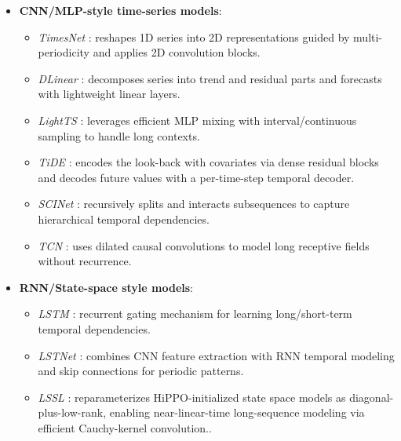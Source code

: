 \begin{itemize}[leftmargin=*, itemsep=2pt]
\item \textbf{CNN/MLP-style time-series models}:
\begin{itemize}[leftmargin=*, itemsep=1pt]
\item \textit{TimesNet} \citep{wu2023timesnet}: reshapes 1D series into 2D representations guided by multi-periodicity and applies 2D convolution blocks.
\item \textit{DLinear} \citep{zeng2023dlinear}: decomposes series into trend and residual parts and forecasts with lightweight linear layers.
\item \textit{LightTS} \citep{campos2023lightts}: leverages efficient MLP mixing with interval/continuous sampling to handle long contexts.
\item \textit{TiDE} \citep{das2023long}: encodes the look-back with covariates via dense residual blocks and decodes future values with a per-time-step temporal decoder.
\item \textit{SCINet} \citep{liu2022scinet}: recursively splits and interacts subsequences to capture hierarchical temporal dependencies.
\item \textit{TCN} \citep{he2019temporal}: uses dilated causal convolutions to model long receptive fields without recurrence.
\end{itemize}

\item \textbf{RNN/State-space style models}:
\begin{itemize}[leftmargin=*, itemsep=1pt]
\item \textit{LSTM} \citep{hochreiter1997long}: recurrent gating mechanism for learning long/short-term temporal dependencies.
\item \textit{LSTNet} \citep{lai2018modeling}: combines CNN feature extraction with RNN temporal modeling and skip connections for periodic patterns.
\item \textit{LSSL} \citep{gu2022efficiently}: reparameterizes HiPPO-initialized state space models as diagonal-plus-low-rank, enabling near-linear-time long-sequence modeling via efficient Cauchy-kernel convolution..
\end{itemize}
\end{itemize}

